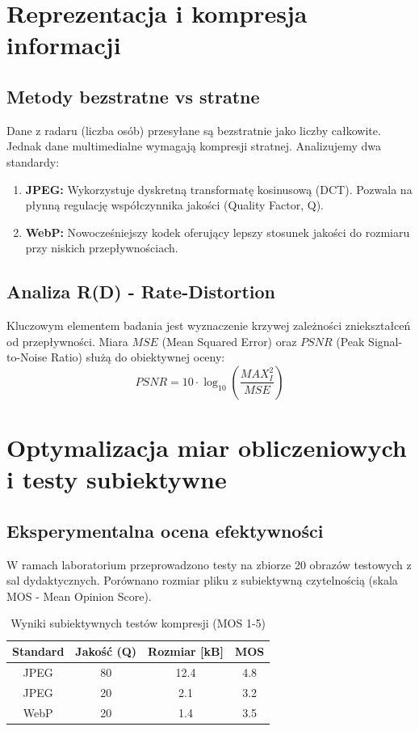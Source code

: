 \documentclass[12pt,a4paper]{article}
\begin{document}
\section{Reprezentacja i kompresja informacji}
\subsection{Metody bezstratne vs stratne}
Dane z radaru (liczba osób) przesyłane są bezstratnie jako liczby całkowite. Jednak dane multimedialne wymagają kompresji stratnej. Analizujemy dwa standardy:
\begin{enumerate}
    \item \textbf{JPEG:} Wykorzystuje dyskretną transformatę kosinusową (DCT). Pozwala na płynną regulację współczynnika jakości (Quality Factor, Q).
    \item \textbf{WebP:} Nowocześniejszy kodek oferujący lepszy stosunek jakości do rozmiaru przy niskich przepływnościach.
\end{enumerate}

\subsection{Analiza R(D) - Rate-Distortion}
Kluczowym elementem badania jest wyznaczenie krzywej zależności zniekształceń od przepływności. Miara $MSE$ (Mean Squared Error) oraz $PSNR$ (Peak Signal-to-Noise Ratio) służą do obiektywnej oceny:
\begin{equation}
    PSNR = 10 \cdot \log_{10} \left( \frac{MAX_I^2}{MSE} \right)
\end{equation}

\section{Optymalizacja miar obliczeniowych i testy subiektywne}
\subsection{Eksperymentalna ocena efektywności}
W ramach laboratorium przeprowadzono testy na zbiorze 20 obrazów testowych z sal dydaktycznych. Porównano rozmiar pliku z subiektywną czytelnością (skala MOS - Mean Opinion Score).

\begin{table}[H]
\centering
\caption{Wyniki subiektywnych testów kompresji (MOS 1-5)}
\begin{tabular}{@{}cccc@{}}
\toprule
Standard & Jakość (Q) & Rozmiar [kB] & MOS \\ \midrule
JPEG     & 80         & 12.4         & 4.8 \\
JPEG     & 20         & 2.1          & 3.2 \\
WebP     & 20         & 1.4          & 3.5 \\ \bottomrule
\end{tabular}
\end{table}
\end{document}
